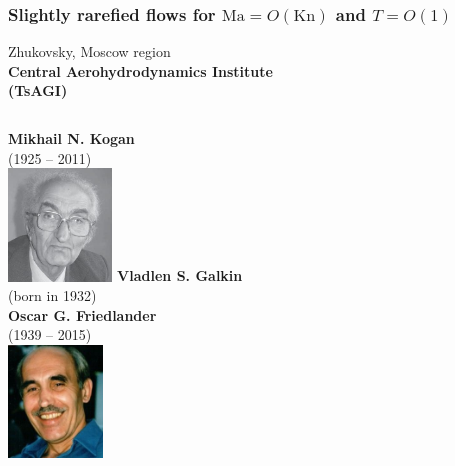 \documentclass[mathserif]{beamer} %
\newcommand{\Kn}{\mathrm{Kn}}
\newcommand{\Ma}{\mathrm{Ma}}
\newcommand{\OO}[1]{O(#1)}
\begin{document}
\begin{frame}
    \frametitle{Slightly rarefied flows for \(\Ma=\OO{\Kn}\) and \(T=\OO{1}\)}
	\centering
    Zhukovsky, Moscow region\\
	{\Large\bf Central Aerohydrodynamics Institute \\ (TsAGI)}
    \vspace{20pt}

    \begin{columns}
		\centering
		\textbf{Mikhail N. Kogan} \\ (1925 -- 2011) \\\vspace{5pt}
		\includegraphics[height=3cm]{photos/Kogan}
		\centering
		\textbf{Vladlen S. Galkin} \\ (born in 1932) \\\vspace{5pt}
		\vspace{3cm}
		\centering
		\textbf{Oscar G. Friedlander} \\ (1939 -- 2015) \\\vspace{5pt}
		\includegraphics[height=3cm]{photos/Friedlander}
	\end{columns}
\end{frame}
\end{document}
